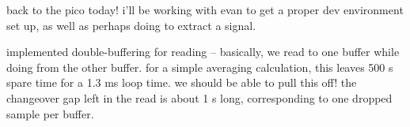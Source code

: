 back to the pico today! i'll be working with evan to get a proper dev
environment set up, as well as perhaps doing \dsp to extract a signal.

implemented double-buffering for \adc reading -- basically, we read to one
buffer while doing \dsp from the other buffer. for a simple averaging
calculation, this leaves 500 \textmu s spare time for a 1.3 ms loop time. we
should be able to pull this off! the changeover gap left in the read is about 1
\textmu s long, corresponding to one dropped sample per buffer.
